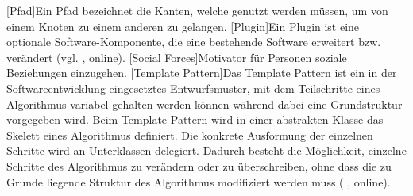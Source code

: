 \begin{acronym}
    [Pfad]{Ein Pfad bezeichnet die Kanten, welche genutzt werden müssen, um von einem Knoten zu einem anderen zu gelangen.}
    [Plugin]{Ein Plugin ist eine optionale Software-Komponente, die eine bestehende Software erweitert bzw. verändert (vgl. \citeauthor{wikipedia_plug-_2019} \citeyear{wikipedia_plug-_2019}, online).}
    [Social Forces]{Motivator für Personen soziale Beziehungen einzugehen.}
    [Template Pattern]{Das Template Pattern ist ein in der Softwareentwicklung eingesetztes Entwurfsmuster, mit dem Teilschritte eines Algorithmus variabel gehalten werden können während dabei eine Grundstruktur vorgegeben wird. Beim Template Pattern wird in einer abstrakten Klasse das Skelett eines Algorithmus definiert. Die konkrete Ausformung der einzelnen Schritte wird an Unterklassen delegiert. Dadurch besteht die Möglichkeit, einzelne Schritte des Algorithmus zu verändern oder zu überschreiben, ohne dass die zu Grunde liegende Struktur des Algorithmus modifiziert werden muss (\citeauthor{wikipedia_schablonenmethode_2018} \citeyear{wikipedia_schablonenmethode_2018}, online).}
\end{acronym}
